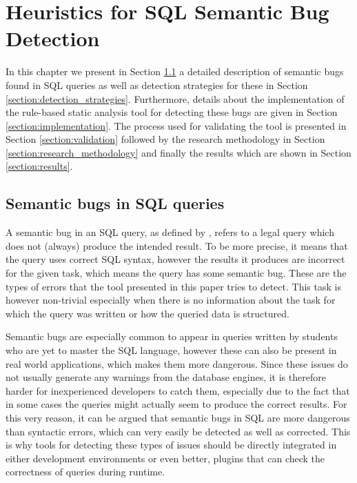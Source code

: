 \chapter{Heuristics for SQL Semantic Bug Detection}
\label{chapter:semantic_bugs_in_sql}

In this chapter we present in Section \ref{section:semantic_bugs} a detailed description of semantic bugs found in SQL queries as well as detection strategies for these in Section \ref{section:detection_strategies}. Furthermore, details about the implementation of the rule-based static analysis tool for detecting these bugs are given in Section \ref{section:implementation}. The process used for validating the tool is presented in Section \ref{section:validation} followed by the research methodology in Section \ref{section:research_methodology} and finally the results which are shown in Section \ref{section:results}.

\section{Semantic bugs in SQL queries}
\label{section:semantic_bugs}

A semantic bug in an SQL query, as defined by \citet{P001}, refers to a legal query which does not (always) produce the intended result. To be more precise, it means that the query uses correct SQL syntax, however the results it produces are incorrect for the given task, which means the query has some semantic bug. These are the types of errors that the tool presented in this paper tries to detect. This task is however non-trivial especially when there is no information about the task for which the query was written or how the queried data is structured. 

Semantic bugs are especially common to appear in queries written by students who are yet to master the SQL language, however these can also be present in real world applications, which makes them more dangerous. Since these issues do not usually generate any warnings from the database engines, it is therefore harder for inexperienced developers to catch them, especially due to the fact that in some cases the queries might actually seem to produce the correct results. For this very reason, it can be argued that semantic bugs in SQL are more dangerous than syntactic errors, which can very easily be detected as well as corrected. This is why tools for detecting these types of issues should be directly integrated in either development environments or even better, plugins that can check the correctness of queries during runtime.

